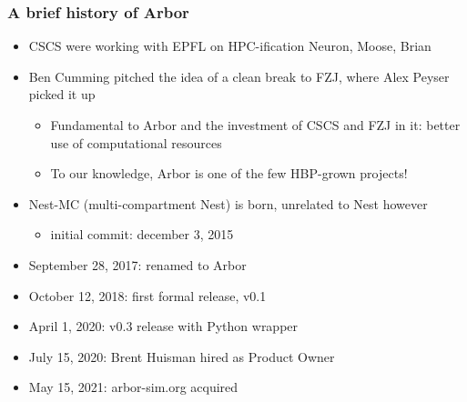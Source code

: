 \documentclass[t]{beamer}
\begin{document}
\begin{frame}
    \frametitle{A brief history of Arbor}
    \begin{itemize}
        \item CSCS were working with EPFL on HPC-ification Neuron, Moose, Brian
        \item Ben Cumming pitched the idea of a clean break to FZJ, where Alex Peyser picked it up
        \begin{itemize}
        \item Fundamental to Arbor and the investment of CSCS and FZJ in it: better use of computational resources
        \item To our knowledge, Arbor is one of the few HBP-grown projects!
        \end{itemize}
        \item Nest-MC (multi-compartment Nest) is born, unrelated to Nest however
        \begin{itemize}
        \item initial commit: december 3, 2015
        \end{itemize}
        \item September 28, 2017: renamed to Arbor
        \item October 12, 2018: first formal release, v0.1
        \item April 1, 2020: v0.3 release with Python wrapper
        \item July 15, 2020: Brent Huisman hired as Product Owner
        \item May 15, 2021: arbor-sim.org acquired
    \end{itemize}
\end{frame}
\end{document}
